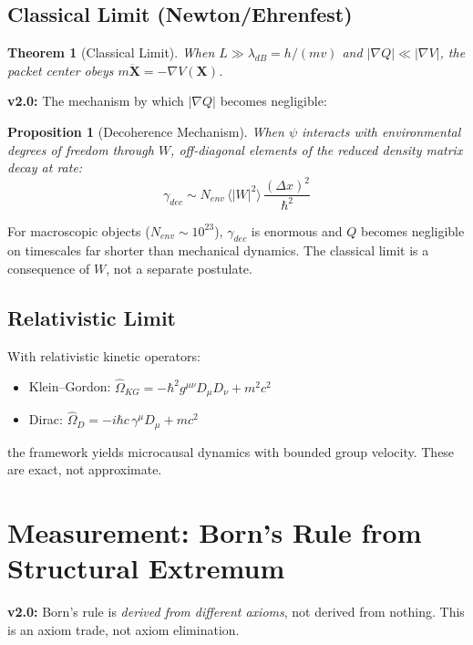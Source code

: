 \documentclass[11pt, a4paper]{article}
\newtheorem{theorem}{Theorem}[section]
\newtheorem{proposition}{Proposition}[section]
\begin{document}
\subsection{Classical Limit (Newton/Ehrenfest)}

\begin{theorem}[Classical Limit]
When $L \gg \lambda_{dB} = h/(mv)$ and $|\nabla Q| \ll |\nabla V|$,
the packet center obeys $m\ddot{\mathbf{X}} = -\nabla V(\mathbf{X})$.
\end{theorem}

\textbf{v2.0:} The mechanism by which $|\nabla Q|$ becomes negligible:

\begin{proposition}[Decoherence Mechanism]
When $\psi$ interacts with environmental degrees of freedom through $W$,
off-diagonal elements of the reduced density matrix decay at rate:
\begin{equation}
  \gamma_{dec} \sim N_{env}\, \langle |W|^2 \rangle\, \frac{(\Delta x)^2}{\hbar^2}
  \label{eq:decoherence}
\end{equation}
\end{proposition}

For macroscopic objects ($N_{env} \sim 10^{23}$), $\gamma_{dec}$ is
enormous and $Q$ becomes negligible on timescales far shorter than
mechanical dynamics. The classical limit is a consequence of $W$, not
a separate postulate.

\subsection{Relativistic Limit}

With relativistic kinetic operators:
\begin{itemize}[nosep]
  \item Klein--Gordon:
    $\hat{\Omega}_{KG} = -\hbar^2 g^{\mu\nu}D_\mu D_\nu + m^2 c^2$
  \item Dirac:
    $\hat{\Omega}_{D} = -i\hbar c\, \gamma^\mu D_\mu + mc^2$
\end{itemize}
the framework yields microcausal dynamics with bounded group velocity.
These are exact, not approximate.

\section{Measurement: Born's Rule from Structural Extremum}

\textbf{v2.0:} Born's rule is \textit{derived from different axioms},
not derived from nothing. This is an axiom trade, not axiom elimination.
\end{document}
